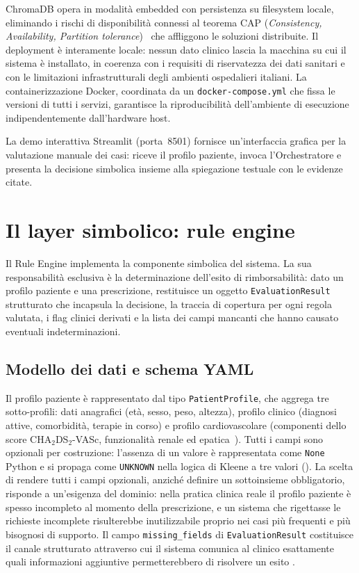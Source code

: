 ChromaDB opera in modalità embedded con persistenza su filesystem locale,
eliminando i rischi di disponibilità connessi al teorema CAP (\emph{Consistency, Availability, Partition tolerance})~\cite{brewer2000cap}
che affliggono le soluzioni distribuite.
Il deployment è interamente locale: nessun dato clinico lascia la macchina
su cui il sistema è installato, in coerenza con i requisiti di riservatezza
dei dati sanitari e con le limitazioni infrastrutturali degli ambienti
ospedalieri italiani.
La containerizzazione Docker, coordinata da un \texttt{docker-compose.yml}
che fissa le versioni di tutti i servizi, garantisce la riproducibilità
dell'ambiente di esecuzione indipendentemente dall'hardware host.

La demo interattiva Streamlit (porta~8501) fornisce un'interfaccia grafica
per la valutazione manuale dei casi: riceve il profilo paziente, invoca
l'Orchestratore e presenta la decisione simbolica insieme alla spiegazione
testuale con le evidenze citate.

\section{Il layer simbolico: rule engine}
\label{sec:layer-simbolico}

Il Rule Engine implementa la componente simbolica del sistema.
La sua responsabilità esclusiva è la determinazione dell'esito di
rimborsabilità: dato un profilo paziente e una prescrizione, restituisce
un oggetto \texttt{EvaluationResult} strutturato che incapsula la decisione,
la traccia di copertura per ogni regola valutata, i flag clinici derivati
e la lista dei campi mancanti che hanno causato eventuali indeterminazioni.

\subsection{Modello dei dati e schema YAML}
\label{subsec:modello-dati}

Il profilo paziente è rappresentato dal tipo \texttt{PatientProfile},
che aggrega tre sotto-profili: dati anagrafici (età, sesso, peso, altezza),
profilo clinico (diagnosi attive, comorbidità, terapie in corso) e profilo
cardiovascolare (componenti dello score CHA$_2$DS$_2$-VASc, funzionalità
renale ed epatica~\cite{lip2010cha2ds2vasc}).
Tutti i campi sono opzionali per costruzione: l'assenza di un valore è
rappresentata come \texttt{None} Python e si propaga come \texttt{UNKNOWN}
nella logica di Kleene a tre valori ().
La scelta di rendere tutti i campi opzionali, anziché definire un sottoinsieme
obbligatorio, risponde a un'esigenza del dominio: nella pratica clinica reale
il profilo paziente è spesso incompleto al momento della prescrizione, e
un sistema che rigettasse le richieste incomplete risulterebbe inutilizzabile
proprio nei casi più frequenti e più bisognosi di supporto.
Il campo \texttt{missing\_fields} di \texttt{EvaluationResult} costituisce
il canale strutturato attraverso cui il sistema comunica al clinico
esattamente quali informazioni aggiuntive permetterebbero di risolvere
un esito .

